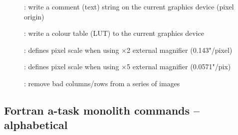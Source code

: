 \begin{description}
\item []: write a comment (text) string on the
current graphics device (pixel origin)

\item []: write a colour table (LUT) to the
current graphics device

\item []: defines pixel scale when using
$\times$2 external magnifier (0.143"/pixel)

\item []: defines pixel scale when using
$\times$5 external magnifier (0.0571"/pix)

\item []: remove bad columns/rows from a series
of images

\end{description}


\newpage
\subsection{\label{ss:atask_applications}Fortran a-task monolith commands -- alphabetical}

